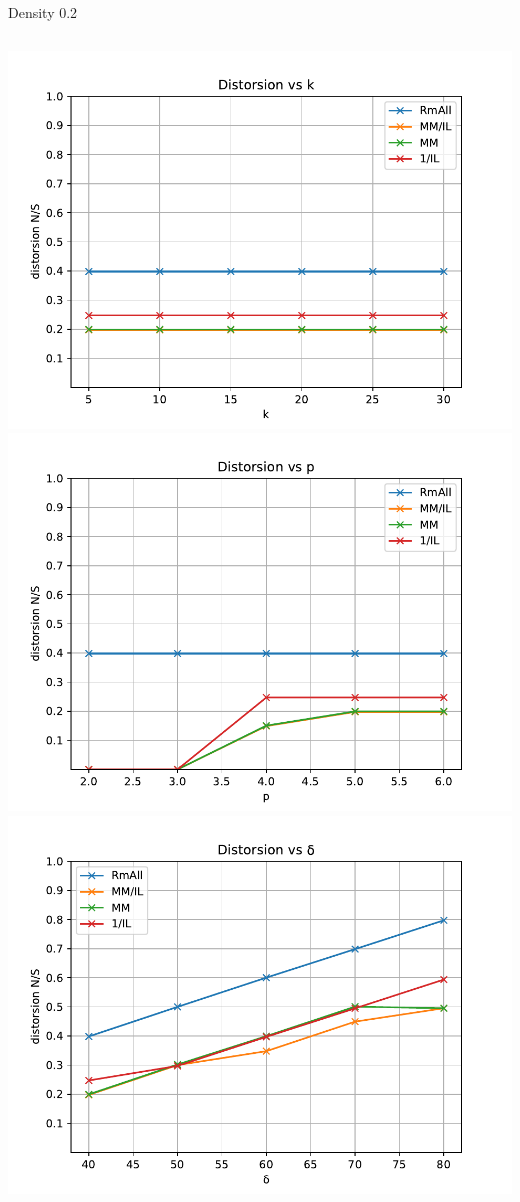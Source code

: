 \documentclass{beamer}
\begin{document}
\begin{frame}[fragile]
\begin{columns}[t]
\end{columns}
Density 0.2
\begin{columns}[t]
\includegraphics[scale=0.27]{img/plt_ds_x10000_y20_d02_k_}
\includegraphics[scale=0.27]{img/plt_ds_x10000_y20_d02_p_}
\includegraphics[scale=0.27]{img/plt_ds_x10000_y20_d02_delta_}
\end{columns}

\end{frame}
\end{document}
